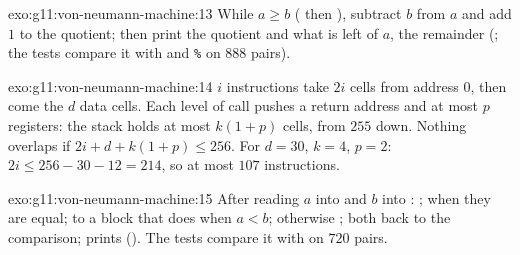 \begin{solution}{exo:g11:von-neumann-machine:13}
While $a \ge b$ ( then ), subtract $b$ from $a$ and add $1$ to the quotient; then print
the quotient and what is left of $a$, the remainder (; the tests compare it with
\code{//} and \texttt{\%} on $888$ pairs).
\end{solution}

\begin{solution}{exo:g11:von-neumann-machine:14}
$i$ instructions take $2i$ cells from address $0$, then come the $d$ data cells. Each level of call pushes a return
address and at most $p$ registers: the stack holds at most $k(1 + p)$ cells, from $255$ down. Nothing overlaps if
$2i + d + k(1 + p) \le 256$. For $d = 30$, $k = 4$, $p = 2$: $2i \le 256 - 30 - 12 = 214$, so at most $107$
instructions.
\end{solution}

\begin{solution}{exo:g11:von-neumann-machine:15}
After reading $a$ into  and $b$ into : ;  when they are equal;
 to a block that does  when $a < b$; otherwise ; both  back to the
comparison;  prints  (). The tests compare it with  on
$720$ pairs.
\end{solution}

